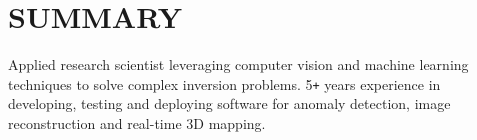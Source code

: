 \section{\small{SUMMARY}}

Applied research scientist leveraging computer vision and machine learning techniques to solve complex inversion problems.
5\verb!+! years experience in developing, testing and deploying software for anomaly detection, image reconstruction and real-time 3D mapping.
